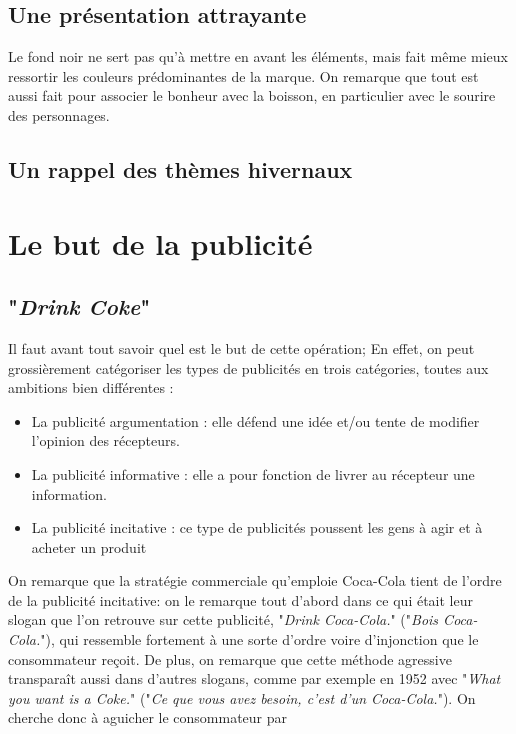 \subsection{Une présentation attrayante}
Le fond noir ne sert pas qu'à mettre en avant les éléments, mais fait même mieux ressortir les couleurs prédominantes de la marque. On remarque que tout est aussi fait pour associer le bonheur avec la boisson, en particulier avec le sourire des personnages.
\subsection{Un rappel des thèmes hivernaux}


\section{Le but de la publicité}

\subsection{"\textit{Drink Coke}"}
Il faut avant tout savoir quel est le but de cette opération; En effet, on peut grossièrement catégoriser les types de publicités en trois catégories, toutes aux ambitions bien différentes :
\renewcommand{\labelitemi}{$\bullet$}
\begin{itemize}
\item La publicité argumentation : elle défend une idée et/ou tente de modifier l’opinion des récepteurs.
\item La publicité informative : elle a pour fonction de livrer au récepteur une information.
\item La publicité incitative : ce type de publicités poussent les gens à agir et à acheter un produit
\end{itemize}
On remarque que la stratégie commerciale qu'emploie Coca-Cola tient de l'ordre de la publicité incitative:
on le remarque tout d'abord dans ce qui était leur slogan que l'on retrouve sur cette publicité, "\textit{Drink Coca-Cola.}" ("\textit{Bois Coca-Cola.}"), qui ressemble fortement à une sorte d'ordre voire d'injonction que le consommateur reçoit. De plus, on remarque que cette méthode agressive transparaît aussi dans d'autres slogans, comme par exemple en 1952 avec "\textit{What you want is a Coke.}" ("\textit{Ce que vous avez besoin, c'est d'un Coca-Cola.}").
On cherche donc à aguicher le consommateur par 